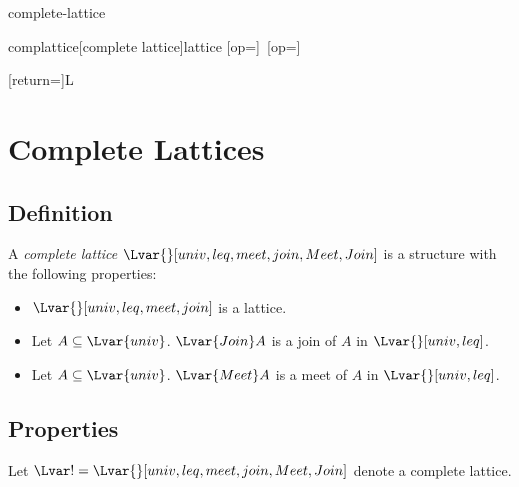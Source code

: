 \documentclass{stex}
\begin{document}
\begin{smodule}{complete-lattice}
\STEXexport{
  \let\Join\relax
}

\begin{extstructure}{complattice}[complete lattice]{lattice}
[op=\bigvee]{\bigvee\,}
[op=\bigwedge]{\bigwedge\,}
\end{extstructure}

[return={\complattice[comp=##1]}]{\mathcal L}

\section{Complete Lattices}

\begin{forthel}
\end{forthel}

\subsection{Definition}

\begin{signature*}[forthel,id=CompleteLatticeSig,printid]
  A \emph{complete lattice $\Lvar{}[univ,leq,meet,join,Meet,Join]$} is a structure with the following properties:

  \begin{itemize}
    \item \label{compLatticeSig}
      $\Lvar{}[univ,leq,meet,join]$ is a lattice.

    \item \label{compLatticeJoinSig}
      Let $A\subseteq\Lvar{univ}$.
      ${\Lvar{Join}}A$ is a join of $A$ in $\Lvar{}[univ,leq]$.

    \item \label{compLatticeMeetSig}
      Let $A\subseteq\Lvar{univ}$.
      ${\Lvar{Meet}}A$ is a meet of $A$ in $\Lvar{}[univ,leq]$.
  \end{itemize}
\end{signature*}

\subsection{Properties}

\begin{forthel}
Let $\Lvar!=\Lvar{}[univ,leq,meet,join,Meet,Join]$ denote a complete lattice.
\end{forthel}


\end{smodule}
\end{document}
